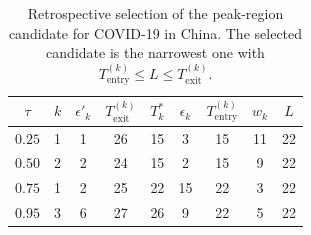 \documentclass[12pt,a4paper]{article}
\begin{document}

\begin{table}[htbp]
	\centering
	\caption{Retrospective selection of the peak-region candidate for
		COVID-19 in China.
		The selected candidate is the narrowest one with
		$T_{\mathrm{entry}}^{(k)}\le L\le T_{\mathrm{exit}}^{(k)}$.}
	\label{tab:china_entry_exit}
	\begin{tabular}{c|cccccccc}
		\toprule
		$\tau$ &
		$k$ &
		$\epsilon'_k$ &
		$T_{\mathrm{exit}}^{(k)}$ &
		$T_k^*$ &
		$\epsilon_k$ &
		$T_{\mathrm{entry}}^{(k)}$ &
		$w_k$ &
		$L$ \\
		\midrule
		$0.25$ & 1 & 1  & 26 & 15 & 3  & 15 & 11 & 22 \\
		$0.50$ & 2 & 2  & 24 & 15 & 2  & 15 & 9  & 22 \\
		$0.75$ & 1 & 2  & 25 & 22 & 15 & 22 & 3 & 22 \\
		$0.95$ & 3 & 6 & 27 & 26 & 9 & 22 & 5 & 22 \\
		\bottomrule
	\end{tabular}
\end{table}

%
\end{document}
